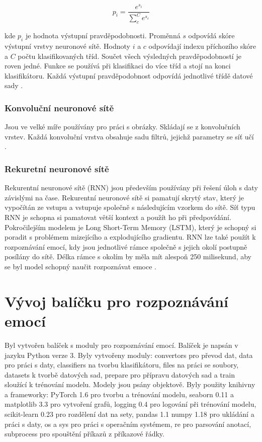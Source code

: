 \documentclass[FM,BP]{tulthesis}
\begin{document}
$$ p_i = \frac{e^{s_i}}{\sum_{c}^{C}e^{s_c}} $$

kde $ p_i $ je hodnota výstupní pravděpodobnosti. Proměnná $ s $ odpovídá skóre výstupní vrstvy neuronové sítě. Hodnoty $ i $ a $ c $ odpovídají indexu příchozího skóre a $ C $ počtu klasifikovaných tříd. Součet všech výsledných pravděpodobností je roven jedné. Funkce se používá při klasifikaci do více tříd a stojí na konci klasifikátoru. Každá výstupní pravděpodobnost odpovídá jednotlivé třídě datové sady \cite{brownlee_2020_Softmax}.

\subsection{Konvoluční neuronové sítě}
Jsou ve velké míře používány pro práci s obrázky. Skládají se z konvolučních vrstev. Každá konvoluční vrstva obsahuje sadu filtrů, jejichž parametry se síť učí \cite{DBLP:journals/corr/abs-1912-10458}.

\subsection{Rekuretní neuronové sítě}
Rekurentní neuronové sítě (RNN) jsou především používány při řešení úloh s daty závislými na čase. Rekurentní neuronové sítě si pamatují skrytý stav, který je vypočítán ze vstupu a vstupuje společně s následujícím vzorkem do sítě. Síť typu RNN je schopna si pamatovat větší kontext a použít ho při předpovídání. Pokročilejším modelem je Long Short-Term Memory (LSTM), který je schopný si poradit s problémem mizejícího a explodujícího gradientu. RNN lze také použít k rozpoznávání emocí, kdy jsou jednotlivé rámce společně s jejich okolí postupně posílány do sítě. Délka rámce s okolím by měla mít alespoň 250 milisekund, aby se byl model schopný naučit rozpoznávat emoce \cite{DBLP:journals/corr/abs-1912-10458}.

\chapter{Vývoj balíčku pro rozpoznávání emocí}
Byl vytvořen balíček s moduly pro rozpoznávání emocí. Balíček je napsán v jazyku Python verze 3. Byly vytvořeny moduly: convertors pro převod dat, data pro práci s daty, classifiers na tvorbu klasifikátoru, files na práci se soubory, datasets k tvorbě datových sad, prepare pro přípravu datových sad a train sloužící k trénování modelu. Modely jsou psány objektově. Byly použity knihivny a frameworky: PyTorch 1.6 pro tvorbu a trénování modelu, seaborn 0.11 a matplotlib 3.3 pro vytvoření grafů, logging 0.4 pro logování při trénování modelu, scikit-learn 0.23 pro rozdělení dat na sety, pandas 1.1 numpy 1.18 pro ukládání a práci s daty, os a sys pro práci s operačním systémem, re pro parsování anotací, subprocess pro spouštění příkazů z příkazové řádky.
\end{document}
